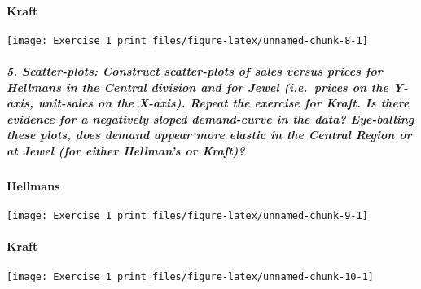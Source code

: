 \documentclass[]{article}
\let\oldparagraph\paragraph
\renewcommand{\paragraph}[1]{\oldparagraph{#1}\mbox{}}
\let\oldsubparagraph\subparagraph
\renewcommand{\subparagraph}[1]{\oldsubparagraph{#1}\mbox{}}
\begin{document}
\hypertarget{kraft-1}{%
\paragraph{Kraft}\label{kraft-1}}

\begin{center}\texttt{[image: Exercise\_1\_print\_files/figure-latex/unnamed-chunk-8-1]} \end{center}

\hypertarget{scatter-plots-construct-scatter-plots-of-sales-versus-prices-for-hellmans-in-the-central-division-and-for-jewel-i.e.prices-on-the-y-axis-unit-sales-on-the-x-axis.-repeat-the-exercise-for-kraft.-is-there-evidence-for-a-negatively-sloped-demand-curve-in-the-data-eye-balling-these-plots-does-demand-appear-more-elastic-in-the-central-region-or-at-jewel-for-either-hellmans-or-kraft}{%
\subparagraph{5. Scatter-plots: Construct scatter-plots of sales versus
prices for Hellmans in the Central division and for Jewel (i.e.~prices
on the Y-axis, unit-sales on the X-axis). Repeat the exercise for Kraft.
Is there evidence for a negatively sloped demand-curve in the data?
Eye-balling these plots, does demand appear more elastic in the Central
Region or at Jewel (for either Hellman's or
Kraft)?}\label{scatter-plots-construct-scatter-plots-of-sales-versus-prices-for-hellmans-in-the-central-division-and-for-jewel-i.e.prices-on-the-y-axis-unit-sales-on-the-x-axis.-repeat-the-exercise-for-kraft.-is-there-evidence-for-a-negatively-sloped-demand-curve-in-the-data-eye-balling-these-plots-does-demand-appear-more-elastic-in-the-central-region-or-at-jewel-for-either-hellmans-or-kraft}}

\hypertarget{hellmans-2}{%
\paragraph{Hellmans}\label{hellmans-2}}

\begin{center}\texttt{[image: Exercise\_1\_print\_files/figure-latex/unnamed-chunk-9-1]} \end{center}

\hypertarget{kraft-2}{%
\paragraph{Kraft}\label{kraft-2}}

\begin{center}\texttt{[image: Exercise\_1\_print\_files/figure-latex/unnamed-chunk-10-1]} \end{center}
\end{document}
